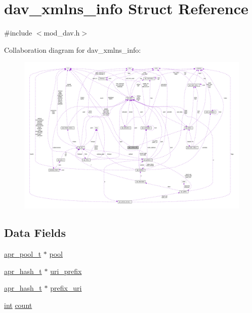 \hypertarget{structdav__xmlns__info}{}\section{dav\+\_\+xmlns\+\_\+info Struct Reference}
\label{structdav__xmlns__info}


{\ttfamily \#include $<$mod\+\_\+dav.\+h$>$}



Collaboration diagram for dav\+\_\+xmlns\+\_\+info\+:
\nopagebreak
\begin{figure}[H]
\begin{center}
\leavevmode
\includegraphics[width=350pt]{structdav__xmlns__info__coll__graph}
\end{center}
\end{figure}
\subsection*{Data Fields}
\begin{DoxyCompactItemize}
\item 
\hyperlink{structapr__pool__t}{apr\+\_\+pool\+\_\+t} $\ast$ \hyperlink{structdav__xmlns__info_a15aaec541bb2555f63e3642e614da271}{pool}
\item 
\hyperlink{structapr__hash__t}{apr\+\_\+hash\+\_\+t} $\ast$ \hyperlink{structdav__xmlns__info_a6668ca67200de693d23df0333a8ad6d8}{uri\+\_\+prefix}
\item 
\hyperlink{structapr__hash__t}{apr\+\_\+hash\+\_\+t} $\ast$ \hyperlink{structdav__xmlns__info_a79e095ca0ae40a73a4f5f7d69c7a44b4}{prefix\+\_\+uri}
\item 
\hyperlink{pcre_8txt_a42dfa4ff673c82d8efe7144098fbc198}{int} \hyperlink{structdav__xmlns__info_a75b9d349015cbd77c18ac27e71d4620f}{count}
\end{DoxyCompactItemize}



